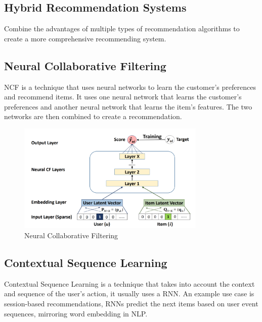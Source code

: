 \subsection{Hybrid Recommendation Systems}
Combine the advantages of multiple types of recommendation algorithms to create a more comprehensive recommending system.
\subsection{Neural Collaborative Filtering}
NCF is a technique that uses neural networks to learn the customer's preferences and recommend items. It uses one neural network that learns the customer's preferences and another neural network that learns the item's features. The two networks are then combined to create a recommendation.
\begin{figure}[H]
    \centering
    \includegraphics[width=0.8\textwidth]{assets/neural-collaborative-filtering.png}
    \caption[Neural Collaborative Filtering]{Neural Collaborative Filtering \cite{NvidiaRecSys}}
    \label{fig:neural-collaborative-filtering}
\end{figure}

\subsection{Contextual Sequence Learning}
Contextual Sequence Learning is a technique that takes into account the context and sequence of the user's action, it usually uses a RNN.
An example use case is session-based recommendations, RNNs predict the next items based on user event sequences, mirroring word embedding in NLP.
